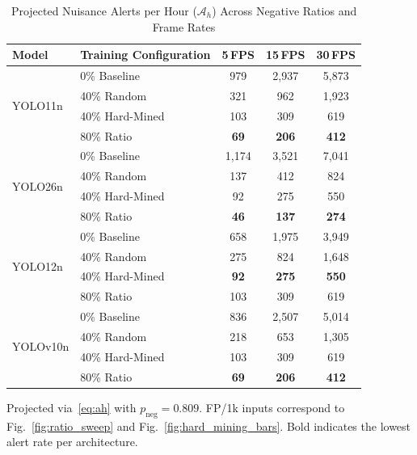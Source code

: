 \documentclass[conference]{IEEEtran}
\begin{document}
\begin{table}[t]
\caption{Projected Nuisance Alerts per Hour ($\mathcal{A}_h$) Across Negative Ratios and Frame Rates}
\label{tab:nuisance_alerts}
\begin{center}
\setlength{\tabcolsep}{4.0pt}
\begin{tabular}{|l|l|c|c|c|}
\hline
\textbf{Model} & \textbf{Training Configuration} & \textbf{5\,FPS} & \textbf{15\,FPS} & \textbf{30\,FPS} \\
\hline
\multirow{4}{*}{YOLO11n}
& 0\% Baseline        & 979     & 2{,}937 & 5{,}873 \\
& 40\% Random         & 321     & 962     & 1{,}923 \\
& 40\% Hard-Mined     & 103     & 309     & 619     \\
& 80\% Ratio          & \textbf{69} & \textbf{206} & \textbf{412} \\
\hline
\multirow{4}{*}{YOLO26n}
& 0\% Baseline        & 1{,}174 & 3{,}521 & 7{,}041 \\
& 40\% Random         & 137     & 412     & 824     \\
& 40\% Hard-Mined     & 92      & 275     & 550     \\
& 80\% Ratio          & \textbf{46} & \textbf{137} & \textbf{274} \\
\hline
\multirow{4}{*}{YOLO12n}
& 0\% Baseline        & 658     & 1{,}975 & 3{,}949 \\
& 40\% Random         & 275     & 824     & 1{,}648 \\
& 40\% Hard-Mined     & \textbf{92} & \textbf{275} & \textbf{550} \\
& 80\% Ratio          & 103     & 309     & 619     \\
\hline
\multirow{4}{*}{YOLOv10n}
& 0\% Baseline        & 836     & 2{,}507 & 5{,}014 \\
& 40\% Random         & 218     & 653     & 1{,}305 \\
& 40\% Hard-Mined     & 103     & 309     & 619     \\
& 80\% Ratio          & \textbf{69} & \textbf{206} & \textbf{412} \\
\hline
\end{tabular}
\end{center}
\vspace{-1pt}
{\footnotesize Projected via~\eqref{eq:ah} with $p_{\mathrm{neg}} = 0.809$. FP/1k inputs correspond to Fig.~\ref{fig:ratio_sweep} and Fig.~\ref{fig:hard_mining_bars}. Bold indicates the lowest alert rate per architecture.}
\end{table}
\end{document}
